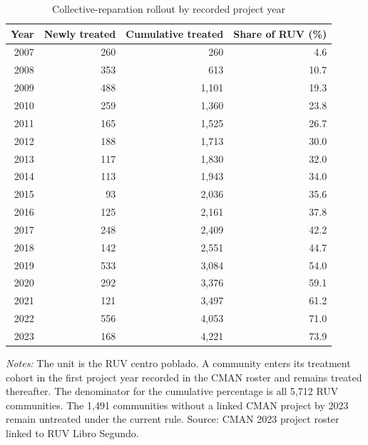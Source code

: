 \begin{table}[!htbp]
\centering
\caption{Collective-reparation rollout by recorded project year}
\label{tab:desc_treatment_rollout}
\begin{tabular}{rrrr}
\toprule
Year & Newly treated & Cumulative treated & Share of RUV (\%) \\
\midrule
2007 & 260 & 260 & 4.6 \\
2008 & 353 & 613 & 10.7 \\
2009 & 488 & 1,101 & 19.3 \\
2010 & 259 & 1,360 & 23.8 \\
2011 & 165 & 1,525 & 26.7 \\
2012 & 188 & 1,713 & 30.0 \\
2013 & 117 & 1,830 & 32.0 \\
2014 & 113 & 1,943 & 34.0 \\
2015 & 93 & 2,036 & 35.6 \\
2016 & 125 & 2,161 & 37.8 \\
2017 & 248 & 2,409 & 42.2 \\
2018 & 142 & 2,551 & 44.7 \\
2019 & 533 & 3,084 & 54.0 \\
2020 & 292 & 3,376 & 59.1 \\
2021 & 121 & 3,497 & 61.2 \\
2022 & 556 & 4,053 & 71.0 \\
2023 & 168 & 4,221 & 73.9 \\
\bottomrule
\end{tabular}
\parbox{0.98\linewidth}{\footnotesize \textit{Notes:} The unit is the RUV centro poblado. A community enters its treatment cohort in the first project year recorded in the CMAN roster and remains treated thereafter. The denominator for the cumulative percentage is all 5,712 RUV communities. The 1,491 communities without a linked CMAN project by 2023 remain untreated under the current rule. Source: CMAN 2023 project roster linked to RUV Libro Segundo.}
\end{table}
